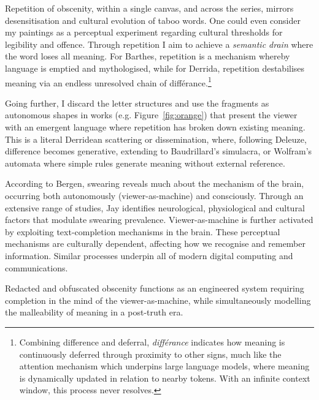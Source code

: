 \documentclass[12pt]{article}
\begin{document}
Repetition of obscenity, within a single canvas, and across the series,
mirrors desensitisation and cultural evolution of taboo words. One
could even consider my paintings as a perceptual experiment regarding
cultural thresholds for legibility and offence. Through repetition I
aim to achieve a \emph{semantic drain} where the word loses all
meaning. For Barthes, repetition is a mechanism whereby language is
emptied and mythologised,\autocite{barthes1957mythologies} while for
Derrida,\autocite{derrida1972dissemination} repetition destabilises
meaning via an endless unresolved chain of
diff\'erance.\footnote{Combining difference and deferral,
  \emph{diff\'erance} indicates how meaning is continuously deferred
  through proximity to other signs, much like the attention mechanism
  which underpins large language models, where meaning is dynamically
  updated in relation to nearby tokens. With an infinite context
  window, this process never resolves.}

Going further, I discard the letter structures and use the fragments
as autonomous shapes in works (e.g. Figure~\ref{fig:orange}) that
present the viewer with an emergent language where repetition has
broken down existing meaning. This is a literal Derridean scattering
or dissemination,\autocite{derrida1972dissemination} where, following
Deleuze,\autocite{deleuze1968difference} difference becomes generative,
extending to Baudrillard's simulacra,\autocite{baudrillard1981simulacra}
or Wolfram's automata\autocite{wolfram} where simple rules generate
meaning without external reference.

According to Bergen, swearing reveals much about the mechanism of the
brain, occurring both autonomously (viewer-as-machine) and
consciously.\autocite{bergen2018what} Through an extensive range of
studies, Jay identifies neurological, physiological and cultural
factors that modulate swearing prevalence.\autocite{jay1999why}
Viewer-as-machine is further activated by exploiting text-completion
mechanisms in the
brain.\autocite{Taylor1953,Reicher1969,Healy1976,GraingerWhitney2004,CohenDehaene2000,Levy2008}
These perceptual mechanisms are culturally
dependent,\autocite{Bartlett1932,Hall1976,ChuaBolandNisbett2005,MasudaNisbett2001}
affecting how we recognise and remember information. Similar processes
underpin all of modern digital computing and
communications.\autocite{shannon1948}

Redacted and obfuscated obscenity functions as an engineered system
requiring completion in the mind of the viewer-as-machine, while
simultaneously modelling the malleability of meaning in a post-truth
era.
\end{document}
